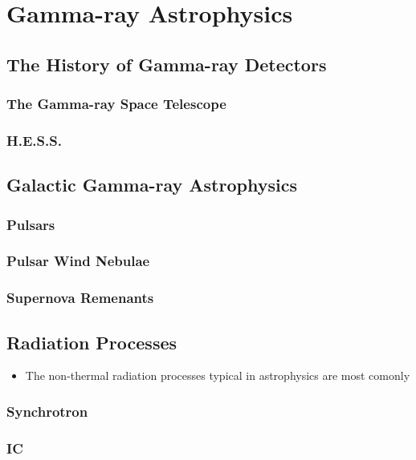 
\chapter{Gamma-ray Astrophysics}

\section{The History of Gamma-ray Detectors}
\subsection{The \fermi Gamma-ray Space Telescope}
\subsection{H.E.S.S.}

\section{Galactic Gamma-ray Astrophysics}
\subsection{Pulsars}
\subsection{Pulsar Wind Nebulae}
\subsection{Supernova Remenants}

\section{Radiation Processes}

\begin{itemize}
  \item The non-thermal radiation processes typical
    in astrophysics are most comonly
\end{itemize}

\subsection{Synchrotron}

\subsection{\acl{IC}}

